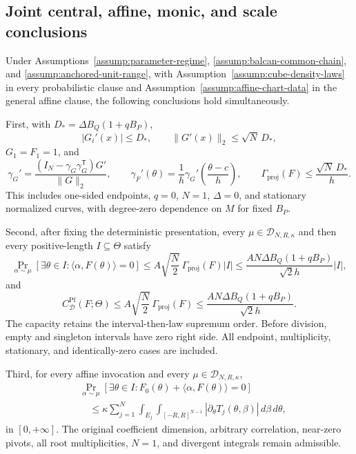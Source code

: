 \subsection{Joint central, affine, monic, and scale conclusions}
\label{app:full-conjunction}

\begin{proposition}
\label{prop:full-conjunction}
Under Assumptions~\ref{assump:parameter-regime},
\ref{assump:balcan-common-chain}, and
\ref{assump:anchored-unit-range}, with
Assumption~\ref{assump:cube-density-laws} in every probabilistic clause and
Assumption~\ref{assump:affine-chart-data} in the general affine clause, the
following conclusions hold simultaneously.

First, with $D_*=\Delta B_Q(1+qB_P)$,
\[
|G_i'(x)|\leq D_*,
\qquad
\|G'(x)\|_2\leq\sqrt N\,D_*,
\]
$G_1=F_1=1$, and
\[
\gamma_G'
=\frac{(I_N-\gamma_G\gamma_G^{\mathsf T})G'}{\|G\|_2},
\qquad
\gamma_F'(\theta)
=\frac1h\gamma_G'\!\left(\frac{\theta-c}{h}\right),
\qquad
\Gamma_{\mathrm{proj}}(F)
\leq\frac{\sqrt N\,D_*}{h}.
\tag{A.79}
\]
This includes one-sided endpoints, $q=0$, $N=1$, $\Delta=0$, and stationary
normalized curves, with degree-zero dependence on $M$ for fixed $B_P$.

Second, after fixing the deterministic presentation, every
$\mu\in\mathcal D_{N,R,\kappa}$ and then every positive-length
$I\subseteq\Theta$ satisfy
\[
\Pr_{\alpha\sim\mu}
[\exists\theta\in I:\langle\alpha,F(\theta)\rangle=0]
\leq A\sqrt{\frac N2}\,\Gamma_{\mathrm{proj}}(F)|I|
\leq\frac{AN\Delta B_Q(1+qB_P)}{\sqrt2 h}|I|,
\tag{A.80}
\]
and
\[
C^{\mathrm{Pf}}_{\mathcal D}(F;\Theta)
\leq A\sqrt{\frac N2}\,\Gamma_{\mathrm{proj}}(F)
\leq\frac{AN\Delta B_Q(1+qB_P)}{\sqrt2 h}.
\tag{A.81}
\]
The capacity retains the interval-then-law supremum order.  Before division,
empty and singleton intervals have zero right side.  All endpoint,
multiplicity, stationary, and identically-zero cases are included.

Third, for every affine invocation and every
$\mu\in\mathcal D_{N,R,\kappa}$,
\[
\begin{aligned}
&\Pr_{\alpha\sim\mu}
[\exists\theta\in I:F_0(\theta)+\langle\alpha,F(\theta)\rangle=0]\\
&\quad\leq\kappa\sum_{j=1}^N
\int_{E_j}\int_{[-R,R]^{N-1}}
|\partial_\theta T_j(\theta,\beta)|\,d\beta\,d\theta,
\end{aligned}
\tag{A.82}
\]
in $[0,+\infty]$.  The original coefficient dimension, arbitrary
correlation, near-zero pivots, all root multiplicities, $N=1$, and divergent
integrals remain admissible.


\end{proposition}

